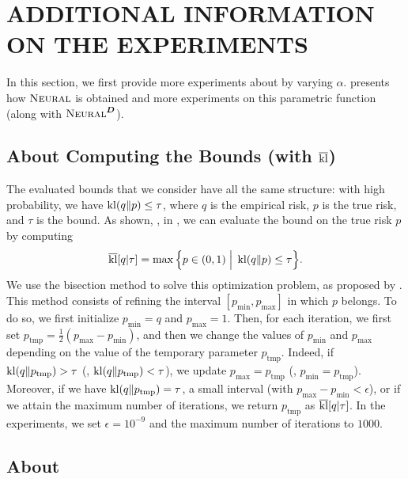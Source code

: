 \documentclass[twoside]{article}
\theoremstyle{plain}
\begin{document}
\section{ADDITIONAL INFORMATION ON THE EXPERIMENTS}
\label{sec:additional-experiments}

In this section, we first provide more experiments about  by varying $\alpha$.
 presents how $\text{\sc Neural}$ is obtained and more experiments on this parametric function (along with $\text{\sc Neural}^{\boldsymbol{D}}$).

\subsection[About Computing the Bounds]{About Computing the Bounds (with $\overline{\operatorname{kl}}$)}

The evaluated bounds that we consider have all the same structure: with high probability, we have $\operatorname{kl}(q\|p) \le \tau$, where $q$ is the empirical risk, $p$ is the true risk, and $\tau$ is the bound.
As shown, \eg, in , we can evaluate the bound on the true risk $p$ by computing 
\begin{align*}
\overline{\operatorname{kl}}[q | \tau]=\max\Big\{ p \in (0,1) \;\Big|\; \operatorname{kl}(q\|p) \le \tau\Big\}.
\end{align*}
We use the bisection method to solve this optimization problem, as proposed by \citet{reeb2018learning}.
This method consists of refining the interval $[p_{\text{min}}, p_{\text{max}}]$ in which $p$ belongs.
To do so, we first initialize $p_{\text{min}}=q$ and $p_{\text{max}}=1$.
Then, for each iteration, we first set $p_{\text{tmp}}=\frac{1}{2}(p_{\text{max}}-p_{\text{min}})$, and then we change the values of $p_{\text{min}}$ and $p_{\text{max}}$ depending on the value of the temporary parameter $p_{\text{tmp}}$.
Indeed, if $\operatorname{kl}(q\|p_{\text{tmp}})>\tau$ (\resp, $\operatorname{kl}(q\|p_{\text{tmp}})<\tau$), we update $p_{\text{max}}=p_{\text{tmp}}$ (\resp, $p_{\text{min}}=p_{\text{tmp}}$).
Moreover, if we have $\operatorname{kl}(q\|p_{\text{tmp}})=\tau$, a small interval (with $p_{\text{max}}-p_{\text{min}}<\epsilon$), or if we attain the maximum number of iterations, we return $p_{\text{tmp}}$ as $\overline{\operatorname{kl}}[q | \tau]$.
In the experiments, we set $\epsilon=10^{-9}$ and the maximum number of iterations to $1000$.

\subsection[About Section 4.3]{About }
\label{sec:additional-experiments-reg-risk}
\end{document}
